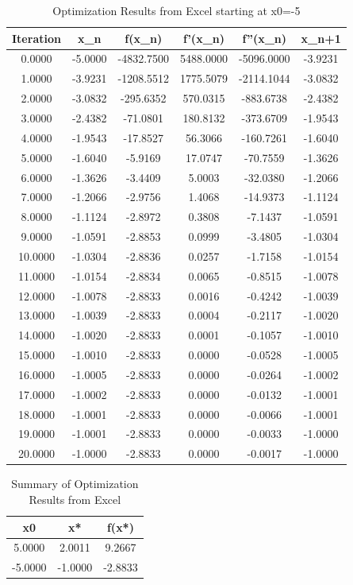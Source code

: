 \documentclass{article}%
\begin{document}
\begin{table}[H]%
\centering%
\begin{tabular}{cccccc}%
\hline%
Iteration&x\_n&f(x\_n)&f'(x\_n)&f''(x\_n)&x\_n+1\\%
\hline%
0.0000&{-}5.0000&{-}4832.7500&5488.0000&{-}5096.0000&{-}3.9231\\%
\hline%
1.0000&{-}3.9231&{-}1208.5512&1775.5079&{-}2114.1044&{-}3.0832\\%
\hline%
2.0000&{-}3.0832&{-}295.6352&570.0315&{-}883.6738&{-}2.4382\\%
\hline%
3.0000&{-}2.4382&{-}71.0801&180.8132&{-}373.6709&{-}1.9543\\%
\hline%
4.0000&{-}1.9543&{-}17.8527&56.3066&{-}160.7261&{-}1.6040\\%
\hline%
5.0000&{-}1.6040&{-}5.9169&17.0747&{-}70.7559&{-}1.3626\\%
\hline%
6.0000&{-}1.3626&{-}3.4409&5.0003&{-}32.0380&{-}1.2066\\%
\hline%
7.0000&{-}1.2066&{-}2.9756&1.4068&{-}14.9373&{-}1.1124\\%
\hline%
8.0000&{-}1.1124&{-}2.8972&0.3808&{-}7.1437&{-}1.0591\\%
\hline%
9.0000&{-}1.0591&{-}2.8853&0.0999&{-}3.4805&{-}1.0304\\%
\hline%
10.0000&{-}1.0304&{-}2.8836&0.0257&{-}1.7158&{-}1.0154\\%
\hline%
11.0000&{-}1.0154&{-}2.8834&0.0065&{-}0.8515&{-}1.0078\\%
\hline%
12.0000&{-}1.0078&{-}2.8833&0.0016&{-}0.4242&{-}1.0039\\%
\hline%
13.0000&{-}1.0039&{-}2.8833&0.0004&{-}0.2117&{-}1.0020\\%
\hline%
14.0000&{-}1.0020&{-}2.8833&0.0001&{-}0.1057&{-}1.0010\\%
\hline%
15.0000&{-}1.0010&{-}2.8833&0.0000&{-}0.0528&{-}1.0005\\%
\hline%
16.0000&{-}1.0005&{-}2.8833&0.0000&{-}0.0264&{-}1.0002\\%
\hline%
17.0000&{-}1.0002&{-}2.8833&0.0000&{-}0.0132&{-}1.0001\\%
\hline%
18.0000&{-}1.0001&{-}2.8833&0.0000&{-}0.0066&{-}1.0001\\%
\hline%
19.0000&{-}1.0001&{-}2.8833&0.0000&{-}0.0033&{-}1.0000\\%
\hline%
20.0000&{-}1.0000&{-}2.8833&0.0000&{-}0.0017&{-}1.0000\\%
\hline%
\end{tabular}%
\caption{Optimization Results from Excel starting at x0={-}5}%
\end{table}%
\begin{table}[H]%
\centering%
\begin{tabular}{ccc}%
\hline%
x0&x*&f(x*)\\%
\hline%
5.0000&2.0011&9.2667\\%
\hline%
{-}5.0000&{-}1.0000&{-}2.8833\\%
\hline%
\end{tabular}%
\caption{Summary of Optimization Results from Excel}%
\end{table}
\end{document}
